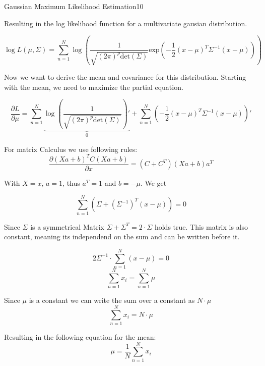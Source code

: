 \begin{questions}
\begin{question}{Gaussian Maximum Likelihood Estimation}{10}
\begin{answer}
Resulting in the log likelihood function for a multivariate gausian distribution.

\begin{equation} \label{L}
	\log L(\mu, \Sigma) = \sum_{n=1}^{N} \log (\frac{1}{\sqrt{(2\pi)^p \text{det}(\Sigma)}} \text{exp} (-\frac{1}{2}(x-\mu)^T \Sigma^{-1} (x-\mu)))
\end{equation}

Now we want to derive the mean and covariance for this distribution. Starting with the mean, we need to maximize the partial equation. 

\begin{equation}
\frac{\partial L }{\partial \mu} = \sum_{n=1}^{N} \underbrace{\log (\frac{1}{\sqrt{(2\pi)^p \text{det}(\Sigma)}})'}_{0} + 
\sum_{n=1}^{N} (-\frac{1}{2}(x-\mu)^T \Sigma^{-1} (x-\mu))'
\end{equation}

For matrix Calculus we use following rules:
\begin{equation}
\frac{\partial(Xa+b)^T C(Xa+b)}{\partial x} = (C+C^T) (Xa +b)a^T
\end{equation}

With $X = x$, $a = 1$, thus $a^T = 1$ and $b = -\mu$. We get

\begin{equation}
\sum_{n=1}^{N} (\Sigma + (\Sigma^{-1})^T (x - \mu)) = 0
\end{equation}

Since $\Sigma$ is a symmetrical Matrix $\Sigma + \Sigma^T = 2\cdot\Sigma$ holds true. This matrix is also constant, meaning its independend on the sum and can be written before it.

\begin{equation}
2\Sigma^{-1} \cdot \sum_{n=1}^{N} (x-\mu) = 0
\end{equation}
\begin{equation}
\sum_{n=1}^{N}x_i = \sum_{n=1}^{N}\mu
\end{equation}

Since $\mu$ is a constant we can write the sum over a constant as $N\cdot\mu$
\begin{equation}
\sum_{n=1}^{N}x_i = N\cdot\mu
\end{equation}

Resulting in the following equation for the mean:
\begin{equation}
\mu = \frac{1}{N} \sum_{n=1}^{N}x_i
\end{equation}


\end{answer}
\end{question}
\end{questions}
